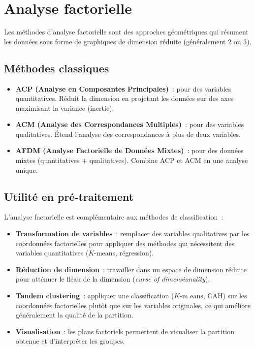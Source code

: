 \documentclass[a4paper,11pt]{article}
\theoremstyle{definition}
\theoremstyle{remark}
\begin{document}
\section{Analyse factorielle}

Les m\'ethodes d'analyse factorielle sont des approches g\'eom\'etriques
qui r\'esument les donn\'ees sous forme de graphiques de dimension
r\'eduite (g\'en\'eralement 2 ou 3).

\subsection{M\'ethodes classiques}

\begin{itemize}
  \item \textbf{ACP (Analyse en Composantes Principales)}~: pour
    des variables quantitatives. R\'eduit la dimension en projetant
    les donn\'ees sur des axes maximisant la variance (inertie).
  \item \textbf{ACM (Analyse des Correspondances Multiples)}~: pour
    des variables qualitatives. \'Etend l'analyse des correspondances
    \`a plus de deux variables.
  \item \textbf{AFDM (Analyse Factorielle de Donn\'ees Mixtes)}~:
    pour des donn\'ees mixtes (quantitatives + qualitatives).
    Combine ACP et ACM en une analyse unique.
\end{itemize}

\subsection{Utilit\'e en pr\'e-traitement}

L'analyse factorielle est compl\'ementaire aux m\'ethodes de
classification~:

\begin{itemize}
  \item \textbf{Transformation de variables}~: remplacer des
    variables qualitatives par les coordonn\'ees factorielles pour
    appliquer des m\'ethodes qui n\'ecessitent des variables
    quantitatives ($K$-means, r\'egression).
  \item \textbf{R\'eduction de dimension}~: travailler dans un
    espace de dimension r\'eduite pour att\'enuer le fl\'eau de la
    dimension (\emph{curse of dimensionality}).
  \item \textbf{Tandem clustering}~: appliquer une classification
    ($K$-m eans, CAH) sur les coordonn\'ees factorielles plut\^ot
    que sur les variables originales, ce qui am\'eliore g\'en\'eralement
    la qualit\'e de la partition.
  \item \textbf{Visualisation}~: les plans factoriels permettent de
    visualiser la partition obtenue et d'interpr\'eter les groupes.
\end{itemize}
\end{document}
